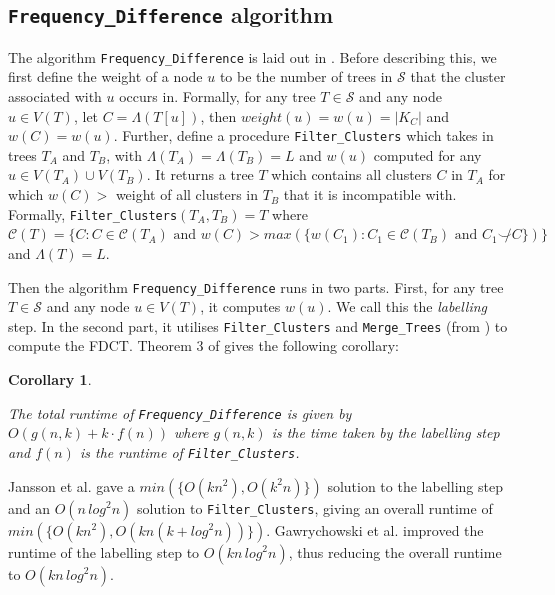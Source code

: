 \documentclass{article}
\newcommand{\compatible}{\smile}
\newcommand{\leafset}{\Lambda}
\newtheorem{freqdiffruntimecomponents}[incompatibility]{Corollary}
\begin{document}
    \subsection{\texttt{Frequency\_Difference} algorithm}
    The algorithm \texttt{Frequency\_Difference} is laid out in \cite{jansson2018algorithms}. Before describing this, we first define the weight of a node $u$ to be the number of trees in $\mathcal{S}$ that the cluster associated with $u$ occurs in. Formally, for any tree $T \in \mathcal{S}$ and any node $u \in V(T)$, let $C = \leafset(T[u])$, then $weight(u) = w(u) = |K_C|$ and $w(C) = w(u)$. Further, define a procedure \texttt{Filter\_Clusters} which takes in trees $T_A$ and $T_B$, with $\leafset(T_A) = \leafset(T_B) = L$ and $w(u)$ computed for any $u \in V(T_A) \cup V(T_B)$. It returns a tree $T$ which contains all clusters $C$ in $T_A$ for which $w(C) > $ weight of all clusters in $T_B$ that it is incompatible with. Formally, \texttt{Filter\_Clusters}$(T_A, T_B) = T$ where $\mathcal{C}(T) = \{C : C \in \mathcal{C}(T_A) \text{ and } w(C) > max(\{w(C_1) : C_1 \in \mathcal{C}(T_B) \text{ and } C_1 \not\compatible C\})\}$ and $\leafset(T) = L$.

    Then the algorithm \texttt{Frequency\_Difference} runs in two parts. First, for any tree $T \in \mathcal{S}$ and any node $u \in V(T)$, it computes $w(u)$. We call this the \textit{labelling} step. In the second part, it utilises \texttt{Filter\_Clusters} and \texttt{Merge\_Trees} (from \cite{jansson2016improved}) to compute the FDCT. Theorem 3 of \cite{jansson2018algorithms} gives the following corollary:
    \newline

    \begin{freqdiffruntimecomponents}
        \label{cor:freqdiffruntimecomponents}

        The total runtime of \texttt{Frequency\_Difference} is given by $O(g(n, k) + k \cdot f(n))$ where $g(n, k)$ is the time taken by the labelling step and $f(n)$ is the runtime of \texttt{Filter\_Clusters}.
    \end{freqdiffruntimecomponents}

    Jansson et al. \cite{jansson2018algorithms} gave a $min(\{O(kn^2), O(k^2n)\})$ solution to the labelling step and an $O(n\,log^2n)$ solution to \texttt{Filter\_Clusters}, giving an overall runtime of $min(\{O(kn^2), O(kn(k + log^2n))\})$. Gawrychowski et al. \cite{gawrychowski2017faster} improved the runtime of the labelling step to $O(kn\,log^2n)$, thus reducing the overall runtime to $O(kn\,log^2n)$.
\end{document}
